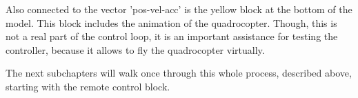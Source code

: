 Also connected to the vector 'pos-vel-acc' is the yellow block at the bottom of the model. This block includes the animation of the quadrocopter. Though, this is not a real part of the control loop, it is an important assistance for testing the controller, because it allows to fly the quadrocopter virtually.

The next subchapters will walk once through this whole process, described above, starting with the remote control block.